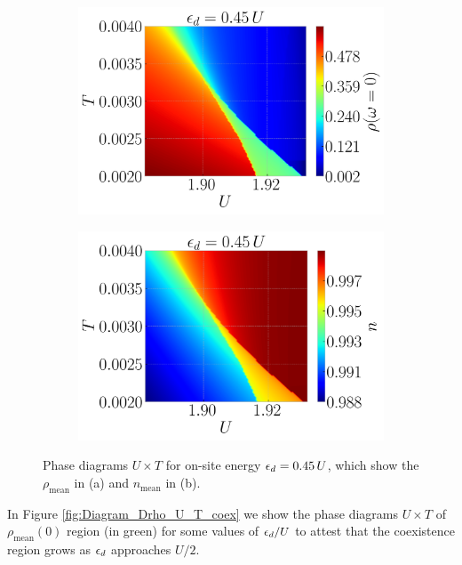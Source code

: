 \documentclass[12pt]{report}
\begin{document}
\begin{figure}[H]
\centering
\begin{subfigure}{.5\textwidth}
  \centering
  \includegraphics[width=\linewidth]{fig/dmft/mean2_0-mu045.png}
  \caption{}
  \label{fig:mu045-rho0}
\end{subfigure}%
\begin{subfigure}{.5\textwidth}
  \centering
  \includegraphics[width=\linewidth]{fig/dmft/mean2_n-mu045.png}
  \caption{}
  \label{fig:mu045-n}
\end{subfigure}
\caption{Phase diagrams $U \times T$ for on-site energy $\epsilon_d = 0.45 \, U$, which show the $\rho_{\text{mean}}$ in (a) and $n_{\text{mean}}$ in (b).}
\label{fig:mu045}
\end{figure}

In Figure \ref{fig:Diagram_Drho_U_T_coex} we show the phase diagrams $U \times T$ of $\rho_{\text{mean}}(0)$ region (in green) for some values of $\epsilon_d/U$ to attest that the coexistence region grows as $\epsilon_d$ approaches $U/2$.
\end{document}
